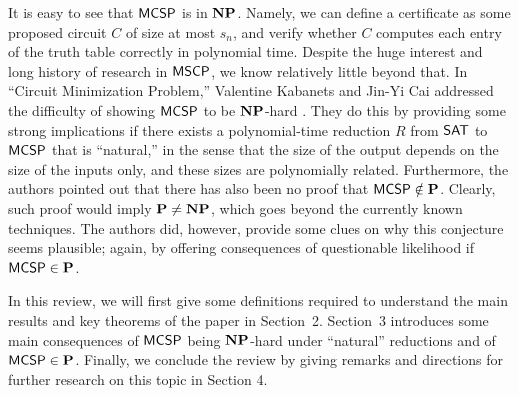 \documentclass[11pt]{article}
\begin{document}
It is easy to see that $\mathsf{MCSP}$ is in $\mathbf{NP}$. Namely, we can define a certificate as some proposed circuit $C$ of size at most $s_n$, and verify whether $C$ computes each entry of the truth table correctly in polynomial time.
%
Despite the huge interest and long history of research in $\mathsf{MSCP}$,
we know relatively little beyond that.
%
In ``Circuit Minimization Problem,'' Valentine Kabanets and Jin-Yi Cai addressed the difficulty of showing $\mathsf{MCSP}$ to be $\mathbf{NP}$-hard \cite{10.1145/335305.335314}. They do this by providing some strong implications if there exists a polynomial-time reduction $R$ from $\mathsf{SAT}$ to $\mathsf{MCSP}$ that is ``natural,'' in the sense that the size of the output depends on the size of the inputs only, and these sizes are polynomially related. Furthermore, the authors pointed
out that there has also been no proof that $\mathsf{MCSP} \notin \mathbf{P}$. Clearly, such proof would imply $\mathbf{P} \neq \mathbf{NP}$, which goes beyond the currently known techniques. The authors did, however, provide some clues on why this conjecture seems plausible; again, by offering consequences of questionable likelihood if $\mathsf{MCSP} \in \mathbf{P}$.

In this review, we will first give some definitions required to understand the main results and key theorems of the paper in Section~2. Section~3 introduces some main consequences of $\mathsf{MCSP}$ being $\mathbf{NP}$-hard under ``natural'' reductions and of $\mathsf{MCSP} \in \mathbf{P}$. Finally, we conclude the review by giving remarks and directions for further research on this topic in Section 4.


%



\end{document}
